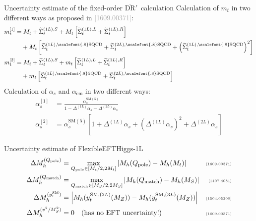 \documentclass[hyperref={pdfpagelabels=false},ngerman]{beamer}
\newcommand{\MS}{\ensuremath{M_S}}
\newcommand{\mycite}[1]{\ensuremath{\text{\textcolor{darkgray}{\tiny [#1]}}}}
\newcommand{\bigcite}[1]{\textcolor{darkgray}{[#1]}}
\newcommand{\DRbarp}{\ensuremath{\overline{\text{DR}}'}}
\newcommand{\SM}{\ensuremath{\text{SM}}}
\newcommand{\as}{\alpha_s}
\newcommand{\aem}{\alpha_\text{em}}
\newcommand{\SQCD}{\ensuremath{\scalefont{.8}\text{SQCD}}}
\newcommand{\Qpole}{\ensuremath{Q_\text{pole}}}
\newcommand{\Qmatch}{\ensuremath{Q_\text{match}}}
\newcommand{\DMhQpole}{\ensuremath{\Delta M_h^{(\Qpole)}}}
\newcommand{\DMhQmatch}{\ensuremath{\Delta M_h^{(\Qmatch)}}}
\newcommand{\DMhHSSUSYytSM}{\ensuremath{\Delta M_h^{(y_t^\SM)}}}
\newcommand{\DMhEFT}{\ensuremath{\Delta M_h^{(v^2/\MS^2)}}}
\begin{document}
\begin{frame}[noframenumbering]{Uncertainty estimate of the fixed-order \DRbarp\ calculation}
  Calculation of $m_t$ in two different ways as proposed in
  \bigcite{1609.00371}:
  \begin{align*}
    m_t^{[1]} &=
                M_t + \widetilde{\Sigma}_t^{(1L),S} +
                M_t \left[
                \widetilde{\Sigma}_t^{(1L),L} +
                \widetilde{\Sigma}_t^{(1L),R}
                \right] \\
              &\phantom{={}} + M_t
                \left[\widetilde{\Sigma}_t^{(1L),\SQCD}
                + \widetilde{\Sigma}_t^{(2L),\SQCD}
                + \left(\widetilde{\Sigma}_t^{(1L),\SQCD}\right)^2
                \right]\\
    m_t^{[2]} &=
                M_t + \widetilde{\Sigma}_t^{(1L),S} +
                m_t \left[
                \widetilde{\Sigma}_t^{(1L),L} +
                \widetilde{\Sigma}_t^{(1L),R}
                \right] \nonumber \\
              &\phantom{={}} +
                m_t
                \left[\widetilde{\Sigma}_t^{(1L),\SQCD} +
                \widetilde{\Sigma}_t^{(2L),\SQCD}
                \right]
  \end{align*}
  Calculation of $\as$ and $\aem$ in two different ways:
  \begin{align*}
    \as^{[1]}  &= \frac{\as^{\SM(5)}}{1 - \Delta^{(1L)}\as - \Delta^{(2L)}\as}\\
    \as^{[2]}  &= \as^{\SM(5)} \left[1 + \Delta^{(1L)}\as + (\Delta^{(1L)}\as)^2 + \Delta^{(2L)}\as\right]
  \end{align*}
\end{frame}


\begin{frame}[noframenumbering]{Uncertainty estimate of FlexibleEFTHiggs-1L}
  \begin{align*}
    \DMhQpole &= \max_{\Qpole\in[M_t/2,2M_t]}\left|M_h(\Qpole) - M_h(M_t)\right| & \text{\mycite{1609.00371}} \\
    \DMhQmatch &= \max_{\Qmatch\in[\MS/2,2\MS]}\left|M_h(\Qmatch) - M_h(\MS)\right| & \text{\mycite{1407.4081}} \\
    \DMhHSSUSYytSM &= \left| M_h(y_t^{\SM,(2L)}(M_Z)) - M_h(y_t^{\SM,(3L)}(M_Z)) \right| & \text{\mycite{1504.05200}} \\
    \DMhEFT &= 0 \quad \text{(has no EFT uncertainty!)} & \text{\mycite{1609.00371}}
  \end{align*}
\end{frame}
\end{document}
